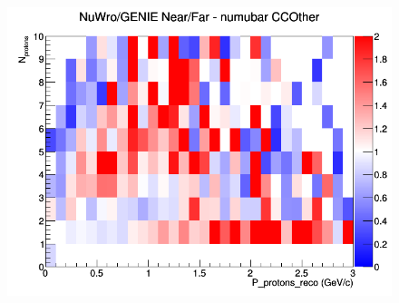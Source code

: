 \begin{figure}[h]
\endminipage
{}
\includegraphics[width=\linewidth]{eff_N_P/GAr/protons/ratios/CCOther_NuWro_GENIE_numubar_NF_N_P.png}
\endminipage
\newline
\end{figure}
\clearpage
